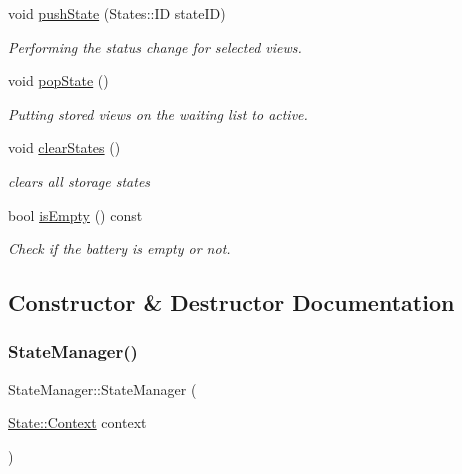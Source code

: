 \begin{DoxyCompactItemize}
void \hyperlink{classStateManager_a4f0c970f9f5cdee29b16b1bc50614180}{push\+State} (States\+::\+ID state\+ID)
\begin{DoxyCompactList}\small\item\em Performing the status change for selected views. \end{DoxyCompactList}\item 
\mbox{\label{classStateManager_a1c5f8c0609e74fb2346b6b7f5930bb38}} 
void \hyperlink{classStateManager_a1c5f8c0609e74fb2346b6b7f5930bb38}{pop\+State} ()
\begin{DoxyCompactList}\small\item\em Putting stored views on the waiting list to active. \end{DoxyCompactList}\item 
\mbox{\label{classStateManager_a3b18f37d97a6d9428daa21318b7381b3}} 
void \hyperlink{classStateManager_a3b18f37d97a6d9428daa21318b7381b3}{clear\+States} ()
\begin{DoxyCompactList}\small\item\em clears all storage states \end{DoxyCompactList}\item 
bool \hyperlink{classStateManager_ad66deb9a952a99c7c9943ebdbb7263d0}{is\+Empty} () const
\begin{DoxyCompactList}\small\item\em Check if the battery is empty or not. \end{DoxyCompactList}\end{DoxyCompactItemize}


\subsection{Constructor \& Destructor Documentation}
\mbox{\label{classStateManager_a4fbfb54fde50aefb32f8fd1cfe234c76}} 
\subsubsection{\texorpdfstring{State\+Manager()}{StateManager()}}
{\footnotesize\ttfamily State\+Manager\+::\+State\+Manager (\begin{DoxyParamCaption}\item[{\hyperlink{structState_1_1Context}{State\+::\+Context}}]{context }\end{DoxyParamCaption})\hspace{0.3cm}{\ttfamily [explicit]}}



